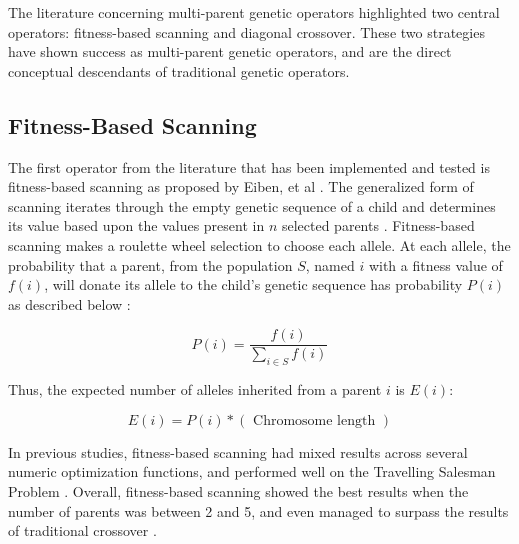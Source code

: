 The literature concerning multi-parent genetic operators highlighted two central operators: fitness-based scanning and diagonal crossover. These two strategies have shown success as multi-parent genetic operators, and are the direct conceptual descendants of traditional genetic operators.

\subsection*{Fitness-Based Scanning}
The first operator from the literature that has been implemented and tested is fitness-based scanning as proposed by Eiben, et al \cite{Eiben94}. The generalized form of scanning iterates through the empty genetic sequence of a child and determines its value based upon the values present in $n$ selected parents \cite{Eiben91}. Fitness-based scanning makes a roulette wheel selection to choose each allele. At each allele, the probability that a parent, from the population $S$, named $i$ with a fitness value of $f(i)$, will donate its allele to the child's genetic sequence has probability $P(i)$ as described below \cite{Eiben94}: 

\[ P(i) = \frac{f(i)}{\sum\limits_{i \in S} f(i)} \]

\noindent Thus, the expected number of alleles inherited from a parent $i$ is $E(i)$\cite{Eiben94}:

\[ E(i) = P(i) *(\text{ Chromosome length }) \]

In previous studies, fitness-based scanning had mixed results across several numeric optimization functions, and performed well on the Travelling Salesman Problem \cite{Eiben94, Eiben95}. Overall, fitness-based scanning showed the best results when the number of parents was between 2 and 5, and even managed to surpass the results of traditional crossover \cite{Eiben94}. 


